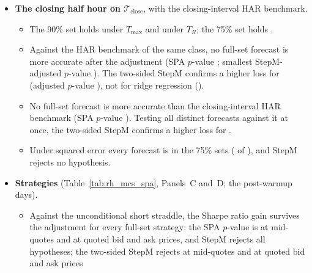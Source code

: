 \begin{itemize}
\begin{itemize}
    under $T_R$ \rhmcsAllQlikeTrangeSetNinety; the 75\% set holds \rhmcsAllQlikeTmaxSetSevenFive. %
  \item Against the HAR benchmark of the same class, the SPA $p$-value is \rhmcsAllQAfSpaC; StepM rejects for
    \rhmcsAllQAfRej, and the two-sided StepM for \rhmcsAllQAfRejTwo.
  \end{itemize}
\item \textbf{The closing half hour on $\mathcal T_{\mathrm{close}}$}, with the closing-interval HAR benchmark.
  \begin{itemize}
  \item The 90\% set holds \rhmcsOosQlikeTmaxSetNinety{} under $T_{\max}$ and \rhmcsOosQlikeTrangeSetNinety{}
    under $T_R$; the 75\% set holds \rhmcsOosQlikeTmaxSetSevenFive.
  \item Against the HAR benchmark of the same class, no full-set forecast is more accurate after the adjustment (SPA
    $p$-value \rhmcsOosQAfSpaC; smallest StepM-adjusted $p$-value \rhmcsOosQAfPMin). The two-sided StepM confirms a
    higher loss for \rhmcsOosQAfRejTwo{} (adjusted $p$-value \rhmcsOosQAfPTwoLasso), not for ridge regression
    (\rhmcsOosQAfPTwoRidge).
  \item No full-set forecast is more accurate than the closing-interval HAR benchmark (SPA $p$-value
    \rhmcsOosQBmSpaC). Testing all \rhmcsNModelsWord{} distinct forecasts against it at once, the two-sided
    StepM confirms a higher loss for \rhmcsOosQBmAllRejTwo.
  \item Under squared error every forecast is in the 75\% sets (\rhmcsOosMseTmaxNSevenFive{} of
    \rhmcsNModelsBench), and StepM rejects no hypothesis.
  \end{itemize}
\item \textbf{Strategies} (Table~\ref{tab:rh_mcs_spa}, Panels~C and~D; the \rheSzDays{} post-warmup days).
  \begin{itemize}
  \item Against the unconditional short straddle, the Sharpe ratio gain survives the adjustment for every full-set
    strategy: the SPA $p$-value is \rhmcsMidShortSrSpaC{} at mid-quotes and \rhmcsBaShortSrSpaC{} at quoted bid and
    ask prices, and StepM rejects all \rhmcsNAlt{} hypotheses; the two-sided StepM rejects
    \rhmcsMidShortSrNRejTwoWord{} at mid-quotes and \rhmcsBaShortSrNRejTwoWord{} at quoted bid and ask prices

\end{itemize}
\end{itemize}
